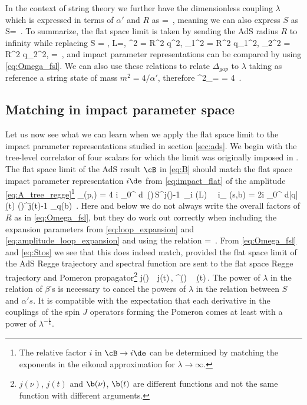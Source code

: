 In the context of string theory we further have the dimensionless coupling $\lambda$ which is expressed in terms of $\alpha'$ and $R$ as
\beq
\sqrt{\l} = \,,
\eeq
meaning we can also express $S$ as
\beq
S= \,.
\label{eq:Stos}
\eeq
To summarize, the flat space limit is taken by
sending the AdS radius $R$ to infinity while replacing
\beq
S = , \quad L=, \quad	\nu^2 = R^2 q^2, \quad \nu_1^2 = R^2 q_1^2, \quad  \nu_2^2 = R^2 q_2^2, \quad \sqrt{\l} =   \,,
		\label{eq:flat_space_limit}
\eeq
and impact parameter representations can be compared by using \eqref{eq:Omega_fsl}.
We can also use these relations to relate $\Delta_{gap}$ to $\lambda$ taking as reference a string state of mass $m^2=4/\alpha'$, therefore
\beq
\Delta^2_{}= = 4 \sqrt{\lambda}\,.
\eeq

\subsection{Matching in impact parameter space}
\label{sec:matching_impact_parameter}
Let us now see what we can learn when we apply the flat space limit to the impact parameter representations studied in section \ref{sec:ads}. We begin with the tree-level correlator of four scalars for which the limit was originally imposed in \cite{Cornalba:2007fs}.
The flat space limit of the AdS result $\cB$ in \eqref{eq:B} should match the flat space impact parameter representation $i \de$ from \eqref{eq:impact_flat} of the amplitude \eqref{eq:A_tree_regge}\footnote{The relative factor $i$ in $\cB \to i \de$ can be determined by matching the exponents in the eikonal approximation for $\lambda \to \infty$.}
\beq
\cB_{}(p,\pb) = 4 \pi i \int\limits_{0}^{\oo} d\nu \, \b(\nu)\,S^{j(\nu)-1}\, \Omega_{i\nu} (L)
\ \to \ 
i\de_{} (s,b) = 2i \int\limits_0^{\oo} d|q|\, \b(t) \left(\right)^{j(t)-1} \omega_q(b) \,.
\label{eq:flat_space_limit_dilatons}
\eeq
Here and below we do not always write the overall factors of $R$ as in \eqref{eq:Omega_fsl}, but they do work out correctly when including the expansion parameters from
\eqref{eq:loop_expansion} and \eqref{eq:amplitude_loop_expansion} and using the relation
\beq
{} =  \,.
\eeq
From \eqref{eq:Omega_fsl} and \eqref{eq:Stos} we see that
this does indeed match, provided  the flat space limit of the AdS Regge trajectory and spectral function are sent to the flat space Regge trajectory and Pomeron propagator\footnote{$j(\nu)$, $j(t)$ and $\b(\nu)$, $\b(t)$ are different functions and not the same function with different arguments.}
\beq
j(\nu)\, \to\,  j(t)\,, \qquad \lambda^{}\b(\nu)\, \to\,   \,\b(t)\,.
\label{eq:lim_beta}
\eeq
The power of $\lambda$ in the relation of $\beta$'s is necessary to cancel the powers of $\lambda$ in the relation between $S$ and $\alpha' s$.
It is compatible with the expectation that each derivative in the couplings of the spin $J$ operators forming the Pomeron comes at least with a power of $\lambda^{-\frac{1}{4}}$.

